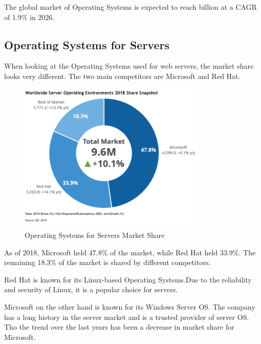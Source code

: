 The global market of Operating Systems is expected to reach  billion at a CAGR of 1.9\% in 2026. 
\cite{OsMarketShare3}

\cite{OsMarketShare}
\cite{OsWikipedia}

\subsection{Operating Systems for Servers}

When looking at the Operating Systems used for web servers, the market share looks very different.
The two main competitors are Microsoft and Red Hat. 

\begin{figure}[H]
    \centering
    \includegraphics[width=0.8\textwidth]{figures/server-operating-system-market-share-2018.png}
    \caption{Operating Systems for Servers Market Share}
    \label{fig:Operating_Systems_for_Servers_Market_Share}
\end{figure}

As of 2018, Microsoft held 47.8\% of the market, while Red Hat held 33.9\%. 
The remaining 18.3\% of the market is shared by different competitors.   

Red Hat is known for its Linux-based Operating Systems.Due to the reliability and security of Linux, it is a popular choice for servers.

Microsoft on the other hand is known for its Windows Server OS. The company has a long history in the server market and is a trusted provider of server OS.
Tho the trend over the last years has been a decrease in market share for Microsoft.

\cite{ServerOsMarketShare}

